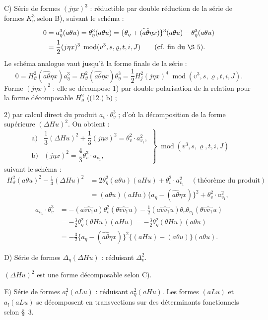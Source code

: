 \documentclass[11pt]{article}
\newcommand{\A}{\Delta}
\newcommand{\R}{\varrho}
\newcommand{\modu}[1]{\;\operatorname{mod} #1}
\providecommand{\modu}[1]{\;\operatorname{mod} #1}
\begin{document}
\noindent C) Série de formes $(j\eta x)^3$ : réductible par double réduction de la série de formes $K_\eta^3$ selon B), suivant le schéma :
\[
\begin{aligned}
0&=a_\eta^3(a\theta u)=\theta_\eta^3(a\theta u)
=\{\theta_\eta+(\widehat{a\theta}\eta x)\}^3(a\theta u)-\theta_\eta^3(a\theta u)\\
&=\frac12(j\eta x)^3\modu{(v^3,s,\R,t,i,J)}
\qquad(\text{cf. fin du \S\ 5}).
\end{aligned}
\]
Le schéma analogue vaut jusqu'à la forme finale de la série :
\[
0=H_\vartheta^2(\widehat{a\theta}\eta x)a_\eta^3
=H_\vartheta^2(\widehat{a\theta}\eta x)\theta_\eta^3=\frac12H_j^2(j\eta x)^4\modu{(v^3,s,\R,t,i,J)}.
\]
Forme $(j\eta x)^2$ : elle se décompose 1) par double polarisation de la relation pour la forme décomposable $H_\vartheta^2$ ((12.) b) ;

2) par calcul direct du produit $a_v\cdot\theta_v^3$ ; d'où la décomposition de la forme supérieure $(\A Hu)^2$. On obtient :
\[
\tag{18}
\displaystyle
\left.\begin{array}{ll}
\text{a)}&\dfrac13(\A Hu)^2+\dfrac13(j\eta x)^2=\theta_v^2\cdot a_{v_1}^2,\\[0.6em]
\text{b)}&(j\eta x)^2=\dfrac43\theta_v^3\cdot a_{v_1},
\end{array}\right\}\modu{(v^3,s,\R,t,i,J)}
\]
suivant le schéma :
\[
\begin{aligned}
H_\vartheta^2(a\theta u)^2-\frac13(\A Hu)^2
&=2\theta_\eta^2(a\theta u)(aHu)+\theta_v^2\cdot a_{v_1}^2
\quad(\text{théorème du produit})\\
&=(a\theta u)(aHu)\{a_\eta-(\widehat{a\theta}\eta x)\}^2+\theta_v^2\cdot a_{v_1}^2,
\end{aligned}
\]
\[
\begin{aligned}
a_{v_1}\cdot\theta_v^3
&=-(a\widehat{vv_1}u)\theta_v^2(\theta\widehat{vv_1}u)-\frac12(a\widehat{vv_1}u)\theta_v\theta_{v_1}(\theta\widehat{vv_1}u)\\
&=-\frac32\theta_\eta^2(\theta Hu)(aHu)=-\frac32\theta_\eta^2(\theta Hu)(a\theta u)\\
&=-\frac32\{a_\eta-(\widehat{a\theta}\eta x)\}^2\{(aHu)-(a\theta u)\}(a\theta u).
\end{aligned}
\]

\noindent D) Série de formes $\A_\eta(\A Hu)$ : réduisant $\A_v^2$.

$(\A Hu)^2$ est une forme décomposable selon C).

\noindent E) Série de formes $a_l^2(aLu)$ : réduisant $a_\eta^2(aHu)$. Les formes $(aLu)$ et $a_l(aLu)$ se décomposent en transvections sur des déterminants fonctionnels selon \S\ 3.
\end{document}
